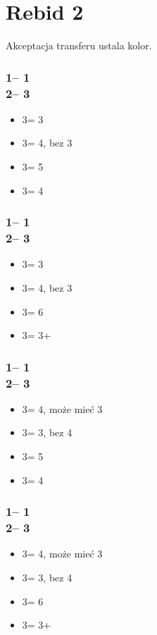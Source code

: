 \documentclass[12pt, a4paper]{report}
\begin{document}
\section*{\colorbox{blue!30}{Rebid 2\ntx}}
 {

    Akceptacja transferu ustala kolor.

    \subsubsection*{1\clubs -- 1\hearts \\ 2\nt -- 3\clubs}
    \begin{itemize}
        \item 3\diams = 3\hearts
        \item 3\hearts = 4\spades, bez 3\hearts
        \item 3\spades = 5\clubs
        \item 3\nt = 4\diams
    \end{itemize}

    \subsubsection*{1\diams -- 1\hearts \\ 2\nt -- 3\clubs}
    \begin{itemize}
        \item 3\diams = 3\hearts
        \item 3\hearts = 4\spades, bez 3\hearts
        \item 3\spades = 6\diams
        \item 3\nt = 3+\clubs
    \end{itemize}

    \subsubsection*{1\clubs -- 1\spades \\ 2\nt -- 3\clubs}
    \begin{itemize}
        \item 3\diams = 4\hearts, może mieć 3\spades
        \item 3\hearts = 3\spades, bez 4\hearts
        \item 3\spades = 5\clubs
        \item 3\nt = 4\diams
    \end{itemize}

    \subsubsection*{1\diams -- 1\spades \\ 2\nt -- 3\clubs}
    \begin{itemize}
        \item 3\diams = 4\hearts, może mieć 3\spades
        \item 3\hearts = 3\spades, bez 4\hearts
        \item 3\spades = 6\diams
        \item 3\nt = 3+\clubs
    \end{itemize}


}
\end{document}
